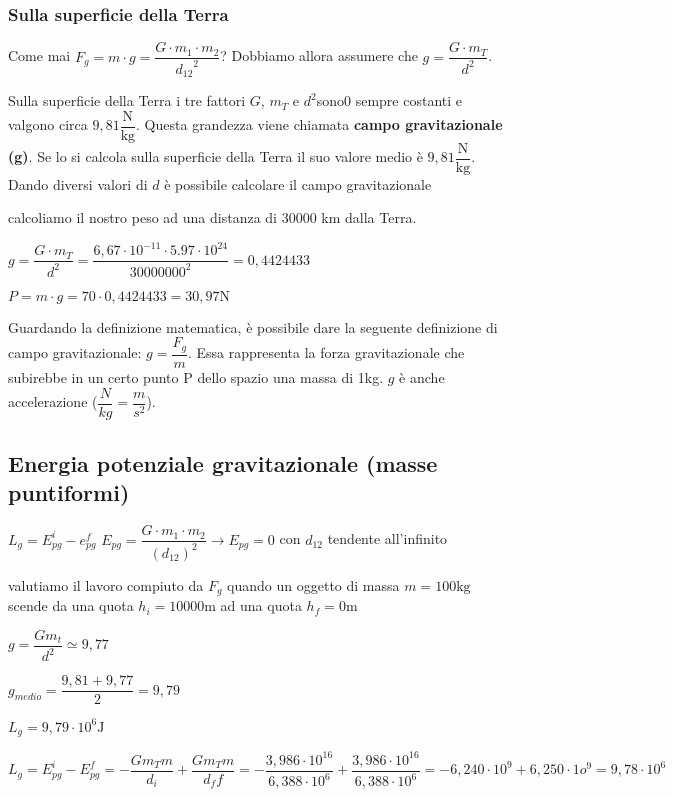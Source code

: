 			\subsubsection{Sulla superficie della Terra}
				Come mai \begin{math}F_g=m\cdot g=\dfrac{G\cdot m_1 \cdot m_2}{{d_{12}}^2}\end{math}? Dobbiamo allora assumere che $g=\dfrac{G\cdot m_T}{d^2}$.
				\par Sulla superficie della Terra i tre fattori $G$, $m_T$ e $d^2$sono0 sempre costanti e valgono circa \textbf{$9,81 \dfrac{\textrm{N}}{\textrm{kg}}$}. Questa grandezza viene chiamata \textbf{campo gravitazionale (g)}. Se lo si calcola sulla superficie della Terra il suo valore medio è $9,81 \dfrac{\textrm{N}}{\textrm{kg}}$. Dando diversi valori di $d$ è possibile calcolare il campo gravitazionale
				\par \esempio calcoliamo il nostro peso ad una distanza di 30000 km dalla Terra.
				\begin{center}
					\par \begin{math}
					g=\dfrac{G\cdot m_T}{d^2}=\dfrac{6,67\cdot 10^{-11} \cdot 5.97\cdot10^{24}}{30000000^2}=0,4424433 \end{math}
					\par\begin{math}
					P=m\cdot g=70\cdot 0,4424433=30,97\textrm{N}
					\end{math}
				\end{center}
				\par Guardando la definizione matematica, è possibile dare la seguente definizione di campo gravitazionale: \textbf{$g=\dfrac{F_g}{m}$}. Essa rappresenta la forza gravitazionale che subirebbe in un certo punto P dello spazio una massa di 1kg. $g$ è anche accelerazione ($\dfrac{N}{kg}=\dfrac{m}{s^2}$).
		\subsection{Energia potenziale gravitazionale (masse puntiformi)}
			$L_g=E_{pg}^i-e_{pg}^f$
			$E_{pg}=\dfrac{G \cdot m_1 \cdot m_2}{(d_{12})^2}\longrightarrow E_{pg}=0$ con $d_{12}$ tendente all'infinito
			\par \esempio valutiamo il lavoro compiuto da $F_g$ quando un oggetto di massa $m=100 \textrm{kg}$ scende da una quota $h_i=10000 \textrm{m}$ ad una quota $h_f=0 \textrm{m}$
			\begin{center}
				\par $g=\dfrac{Gm_t}{d^2}\simeq 9,77$
				\par $g_{medio}=\dfrac{9,81+9,77}{2}=9,79$
				\par $L_g=9,79\cdot 10^6 \textrm{J}$
				\par $L_g=E_{pg}^i-E_{pg}^f=-\dfrac{Gm_Tm}{d_i}+\dfrac{Gm_Tm}{d_ff}=-\dfrac{3,986\cdot10^{16}}{6,388\cdot10^6}+\dfrac{3,986\cdot10^{16}}{6,388\cdot10^6}=-6,240\cdot10^9+6,250\cdot1o^9=9,78\cdot10^6$
			\end{center}
